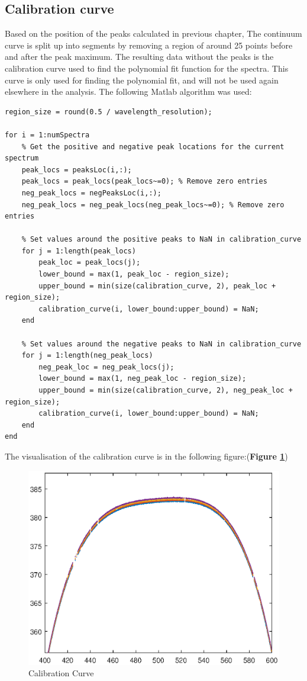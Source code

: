 \subsection{Calibration curve}
Based on the position of the peaks calculated in previous chapter, The continuum curve is split up into segments by removing a region of around 25 points before and after the peak maximum. The resulting data without the peaks is the calibration curve used to find the polynomial fit function for the spectra.
This curve is only used for finding the polynomial fit, and will not be used again elsewhere in the analysis.
The following Matlab algorithm was used:
\begin{lstlisting}
region_size = round(0.5 / wavelength_resolution);

for i = 1:numSpectra
    % Get the positive and negative peak locations for the current spectrum
    peak_locs = peaksLoc(i,:);
    peak_locs = peak_locs(peak_locs~=0); % Remove zero entries
    neg_peak_locs = negPeaksLoc(i,:);
    neg_peak_locs = neg_peak_locs(neg_peak_locs~=0); % Remove zero entries

    % Set values around the positive peaks to NaN in calibration_curve
    for j = 1:length(peak_locs)
        peak_loc = peak_locs(j);
        lower_bound = max(1, peak_loc - region_size);
        upper_bound = min(size(calibration_curve, 2), peak_loc + region_size);
        calibration_curve(i, lower_bound:upper_bound) = NaN;
    end
    
    % Set values around the negative peaks to NaN in calibration_curve
    for j = 1:length(neg_peak_locs)
        neg_peak_loc = neg_peak_locs(j);
        lower_bound = max(1, neg_peak_loc - region_size);
        upper_bound = min(size(calibration_curve, 2), neg_peak_loc + region_size);
        calibration_curve(i, lower_bound:upper_bound) = NaN;
    end
end
\end{lstlisting}
The visualisation of the calibration curve is in the following figure:(\textbf{Figure \ref{fig:Figure 6}})
\begin{figure}[H]
    \centering
    \includegraphics[width = 1\textwidth ]{figures/calibrationCurve.eps}
    \caption{Calibration Curve }
    \label{fig:Figure 6}
\end{figure}

